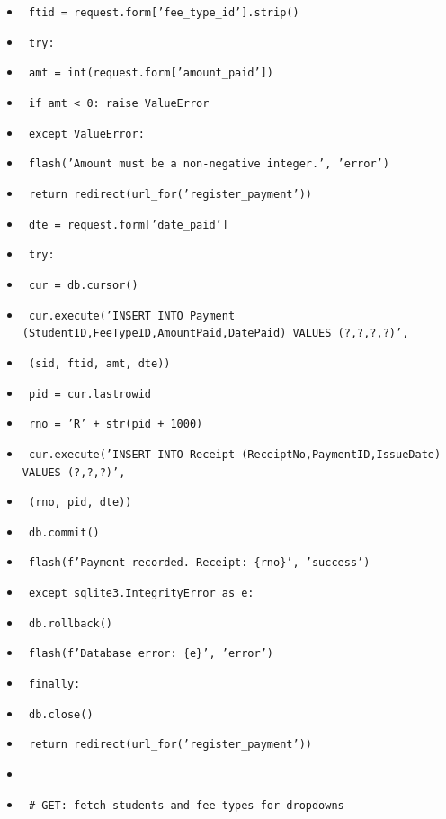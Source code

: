 \documentclass[11pt]{article}
\begin{document}
\begin{methode}
\begin{itemize}
    \item \texttt{        ftid = request.form['fee\_type\_id'].strip()}
    \item \texttt{        try:}
    \item \texttt{            amt = int(request.form['amount\_paid'])}
    \item \texttt{            if amt < 0: raise ValueError}
    \item \texttt{        except ValueError:}
    \item \texttt{            flash('Amount must be a non-negative integer.', 'error')}
    \item \texttt{            return redirect(url\_for('register\_payment'))}
    \item \texttt{        dte = request.form['date\_paid']}
    \item \texttt{        try:}
    \item \texttt{            cur = db.cursor()}
    \item \texttt{            cur.execute('INSERT INTO Payment (StudentID,FeeTypeID,AmountPaid,DatePaid) VALUES (?,?,?,?)',}
    \item \texttt{                         (sid, ftid, amt, dte))}
    \item \texttt{            pid = cur.lastrowid}
    \item \texttt{            rno = 'R' + str(pid + 1000)}
    \item \texttt{            cur.execute('INSERT INTO Receipt (ReceiptNo,PaymentID,IssueDate) VALUES (?,?,?)',}
    \item \texttt{                         (rno, pid, dte))}
    \item \texttt{            db.commit()}
    \item \texttt{            flash(f'Payment recorded. Receipt: \{rno\}', 'success')}
    \item \texttt{        except sqlite3.IntegrityError as e:}
    \item \texttt{            db.rollback()}
    \item \texttt{            flash(f'Database error: \{e\}', 'error')}
    \item \texttt{        finally:}
    \item \texttt{            db.close()}
    \item \texttt{        return redirect(url\_for('register\_payment'))}
    \item \texttt{    }
    \item \texttt{    \# GET: fetch students and fee types for dropdowns}

\end{itemize}
\end{methode}
\end{document}
